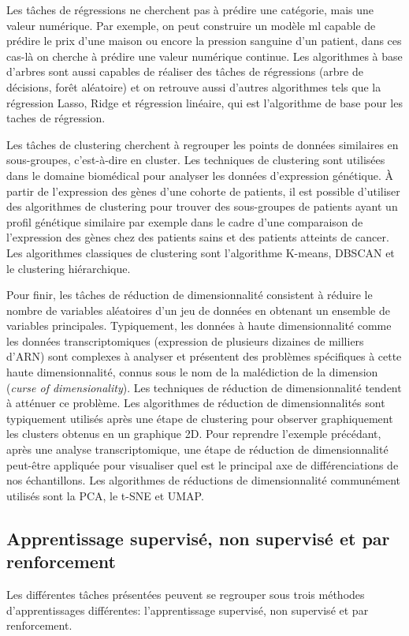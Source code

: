 Les tâches de régressions ne cherchent pas à prédire une catégorie, mais une valeur numérique. Par exemple, on peut construire un modèle \gls{ml} capable de prédire le prix d'une maison ou encore la pression sanguine d'un patient, dans ces cas-là on cherche à prédire une valeur numérique continue. Les algorithmes à base d'arbres sont aussi capables de réaliser des tâches de régressions (arbre de décisions, forêt aléatoire) et on retrouve aussi d'autres algorithmes tels que la régression Lasso, Ridge et régression linéaire, qui est l'algorithme de base pour les taches de régression.

Les tâches de clustering cherchent à regrouper les points de données similaires en sous-groupes, c'est-à-dire en cluster. Les techniques de clustering sont utilisées dans le domaine biomédical pour analyser les données d'expression génétique. À partir de l'expression des gènes d'une cohorte de patients, il est possible d'utiliser des algorithmes de clustering pour trouver des sous-groupes de patients ayant un profil génétique similaire par exemple dans le cadre d'une comparaison de l'expression des gènes chez des patients sains et des patients atteints de cancer. Les algorithmes classiques de clustering sont l'algorithme K-means, DBSCAN et le clustering hiérarchique.

Pour finir, les tâches de réduction de dimensionnalité consistent à réduire le nombre de variables aléatoires d'un jeu de données en obtenant un ensemble de variables principales. Typiquement, les données à haute dimensionnalité comme les données transcriptomiques (expression de plusieurs dizaines de milliers d'ARN) sont complexes à analyser et présentent des problèmes spécifiques à cette haute dimensionnalité, connus sous le nom de la malédiction de la dimension (\textit{curse of dimensionality}). Les techniques de réduction de dimensionnalité tendent à atténuer ce problème. Les algorithmes de réduction de dimensionnalités sont typiquement utilisés après une étape de clustering pour observer graphiquement les clusters obtenus en un graphique 2D. Pour reprendre l'exemple précédant, après une analyse transcriptomique, une étape de réduction de dimensionnalité peut-être appliquée pour visualiser quel est le principal axe de différenciations de nos échantillons. Les algorithmes de réductions de dimensionnalité communément utilisés sont la PCA, le t-SNE et UMAP.

\subsection{Apprentissage supervisé, non supervisé et par renforcement}
Les différentes tâches présentées peuvent se regrouper sous trois méthodes d'apprentissages différentes: l'apprentissage supervisé, non supervisé et par renforcement.

